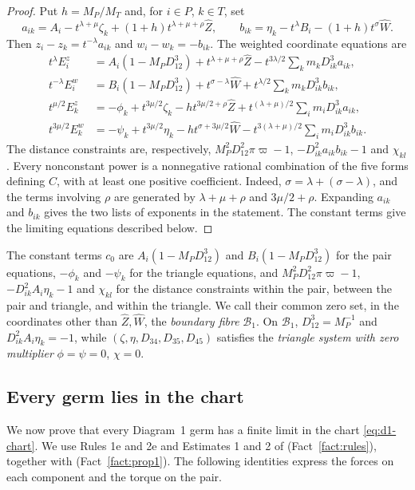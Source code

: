 \documentclass[Threeside,11pt]{article}
\theoremstyle{definition}
\theoremstyle{remark}
\numberwithin{equation}{section}
\theoremstyle{remark}
\begin{document}
{\begin{proof}
Put $h=M_P/M_T$ and, for $i\in P$, $k\in T$, set
\[
 a_{ik}=A_i-t^{\lambda+\mu}\zeta_k
             +(1+h)t^{\lambda+\mu+\rho}\hat Z,\qquad
 b_{ik}=\eta_k-t^\lambda B_i-(1+h)t^\sigma\hat W.
\]
Then $z_i-z_k=t^{-\lambda}a_{ik}$ and $w_i-w_k=-b_{ik}$.
The weighted coordinate equations are
\begin{align*}
 t^\lambda E^z_i
 &=A_i(1-M_PD_{12}^3)+t^{\lambda+\mu+\rho}\hat Z
       -t^{3\lambda/2}\sum_km_kD_{ik}^3a_{ik},\\
 t^{-\lambda}E^w_i
 &=B_i(1-M_PD_{12}^3)+t^{\sigma-\lambda}\hat W
       +t^{\lambda/2}\sum_km_kD_{ik}^3b_{ik},\\
 t^{\mu/2}E^z_k
 &=-\phi_k+t^{3\mu/2}\zeta_k-h t^{3\mu/2+\rho}\hat Z
       +t^{(\lambda+\mu)/2}\sum_im_iD_{ik}^3a_{ik},\\
 t^{3\mu/2}E^w_k
 &=-\psi_k+t^{3\mu/2}\eta_k-h t^{\sigma+3\mu/2}\hat W
       -t^{3(\lambda+\mu)/2}\sum_im_iD_{ik}^3b_{ik}.
\end{align*}
The distance constraints are, respectively,
$M_P^2D_{12}^2\pi\varpi-1$, $-D_{ik}^2a_{ik}b_{ik}-1$ and $\chi_{kl}$.
Every nonconstant power is a nonnegative rational combination of the five forms
defining $C$, with at least one positive coefficient.  Indeed,
$\sigma=\lambda+(\sigma-\lambda)$, and the terms involving $\rho$ are generated by
$\lambda+\mu+\rho$ and $3\mu/2+\rho$.  Expanding $a_{ik}$ and $b_{ik}$ gives the two
lists of exponents in the statement.  The constant terms give the limiting equations
described below.
\end{proof}

}{The constant terms $c_0$ are $A_i(1-M_PD_{12}^3)$ and
$B_i(1-M_PD_{12}^3)$ for the pair equations, $-\phi_k$ and $-\psi_k$ for the triangle
equations, and $M_P^2D_{12}^2\pi\varpi-1$, $-D_{ik}^2A_i\eta_k-1$ and $\chi_{kl}$ for the
distance constraints within the pair, between the pair and triangle, and within the triangle.
We call their common zero set, in the coordinates other than $\hat Z,\hat W$, the
\emph{boundary fibre} $\mathcal B_1$.  On $\mathcal B_1$,
$D_{12}^3=M_P^{-1}$ and $D_{ik}^2A_i\eta_k=-1$, while
$(\zeta,\eta,D_{34},D_{35},D_{45})$ satisfies the \emph{triangle system with zero multiplier}
$\phi=\psi=0$, $\chi=0$.}

\subsection{Every germ lies in the chart}
{We now prove that every Diagram~1 germ has a finite limit in the chart
\eqref{eq:d1-chart}.  We use Rules 1e and 2e and Estimates 1 and 2 of \cite[\S3]{AK}
(Fact~\ref{fact:rules}), together with \cite[Prop.~1]{AK} (Fact~\ref{fact:prop1}).
The following identities express the forces on each component and the torque on the pair.}
\end{document}
